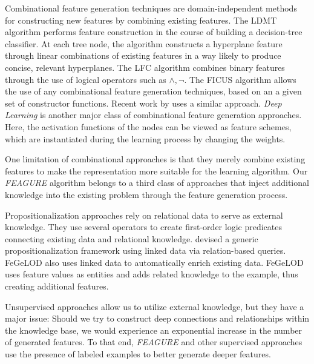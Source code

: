 \documentclass[letterpaper]{article} %
\theoremstyle{definition}
\begin{document}
Combinational feature generation techniques are domain-independent methods for constructing new features by combining existing features. The LDMT algorithm \cite{utgo1991linear} performs feature construction in the course of building a decision-tree classifier. At each tree node, the algorithm constructs a hyperplane feature through linear combinations of existing features in a way likely to produce concise, relevant hyperplanes. The LFC algorithm \cite{ragavan1993complex} combines binary features through the use of logical operators such as $\land ,\lnot$.
The FICUS algorithm \cite{markovitch2002feature} allows the use of any combinational feature generation techniques, based on an a given set of constructor functions. Recent work by \citeauthor{katz2016explorekit}  uses a similar approach.
\emph{Deep Learning} \cite{rumelhart1986learning,lecun1998gradient} is another major class of combinational feature generation approaches. Here, the activation functions of the nodes can be viewed as feature schemes, which are instantiated during the learning process by changing the weights.

One limitation of combinational approaches is that they merely combine existing features to make the representation more suitable for the 
learning algorithm. 
Our \emph{FEAGURE} algorithm belongs to a third class of approaches that inject additional knowledge into the existing problem through the feature generation process.

Propositionalization approaches \cite{kramer2000bottom,cheng2011automatedfull} rely on relational data to serve as external knowledge. They use several operators to create first-order logic predicates connecting existing data and relational knowledge. 
\citeauthor{cheng2011automatedfull}  devised a generic propositionalization framework  using linked data via relation-based queries. 
FeGeLOD \cite{paulheim2012unsupervisedfull} also uses linked data to automatically enrich existing data. 
FeGeLOD uses feature values as entities and adds related knowledge to the example, thus creating additional features. 

Unsupervised approaches allow us to utilize external knowledge, but they have a major issue: Should we try to construct deep connections and relationships within the knowledge base, we would experience an exponential increase in the number of generated features.
To that end, \emph{FEAGURE} and other supervised approaches use the presence of labeled examples to better generate deeper features.
\end{document}
